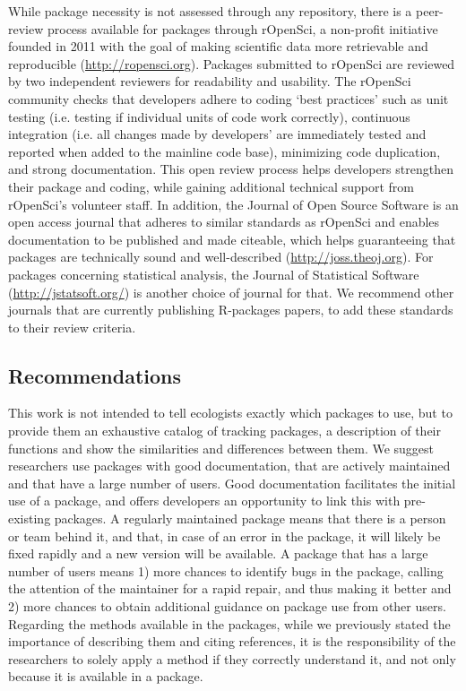 \documentclass[a4paper,12pt]{article}
\begin{document}
	While package necessity is not assessed through any repository, there is a peer-review process available for packages through rOpenSci, a non-profit initiative founded in 2011 with the goal of making scientific data more retrievable and reproducible (\url{http://ropensci.org}). Packages submitted to rOpenSci are reviewed by two independent reviewers for readability and usability. The rOpenSci community checks that developers adhere to coding `best practices' such as unit testing (i.e. testing if individual units of code work correctly), continuous integration (i.e. all changes made by developers' are immediately tested and reported when added to the mainline code base), minimizing code duplication, and strong documentation. This open review process helps developers strengthen their package and coding, while gaining additional technical support from rOpenSci's volunteer staff. In addition, the Journal of Open Source Software is an open access journal that adheres to similar standards as rOpenSci and enables documentation to be published and made citeable, which helps guaranteeing that packages are technically sound and well-described (\url{http://joss.theoj.org}). For packages concerning statistical analysis, the Journal of Statistical Software (\url{http://jstatsoft.org/}) is another choice of journal for that. We recommend other journals that are currently publishing R-packages papers, to add these standards to their review criteria. 
	
	
	\subsection*{Recommendations}
	
	This work is not intended to tell ecologists exactly which packages to use, but to provide them an exhaustive catalog of tracking packages, a description of their functions and show the similarities and differences between them. We suggest researchers use packages with good documentation, that are actively maintained and that have a large number of users. Good documentation facilitates the initial use of a package, and offers developers an opportunity to link this with pre-existing packages. A regularly maintained package means that there is a person or team behind it, and that, in case of an error in the package, it will likely be fixed rapidly and a new version will be available. A package that has a large number of users means 1) more chances to identify bugs in the package, calling the attention of the maintainer for a rapid repair, and thus making it better and 2) more chances to obtain additional guidance on package use from other users. Regarding the methods available in the packages, while we previously stated the importance of describing them and citing references, it is the responsibility of the researchers to solely apply a method if they correctly understand it, and not only because it is available in a package. 
	
\end{document}
